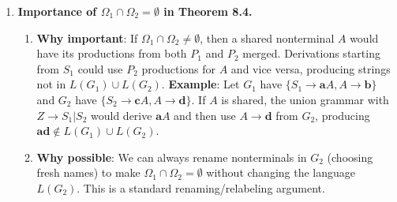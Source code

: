 \begin{enumerate}[{8.}1. ]
$C = \langle\{S,A,B\},\{\pmb{0},\pmb{1}\},S,\{S\to\pmb{0}A|\pmb{1}B|\pmb{0}|\pmb{1}|\lambda,A\to S\pmb{0},B\to S\pmb{1}\}\rangle$.

\begin{enumerate}
\item $L(C) = \{w \in \{\pmb{0},\pmb{1}\}^* \mid w = w^r\}$ --- the set of all palindromes over $\{\pmb{0},\pmb{1}\}$.

Derivation: $S \Rightarrow \pmb{0}A \Rightarrow \pmb{0}S\pmb{0}$. Each step wraps the current sentential form between matching symbols. The grammar generates all even-length and odd-length palindromes.

\item Yes, $L(C) = \{w \mid w = w^r\}$ is not regular (it requires unbounded memory to match the first and last symbols). So $L(C)$ is FAD only for the trivial case; in general, $L(C)$ is not FAD.

\item The definition of regular grammars should \emph{not} be expanded to include such mixed grammars, because the resulting class of languages would no longer coincide with the regular languages. Mixed grammars generate languages (like palindromes) that are context-free but not regular.
\end{enumerate}

\item \textbf{Importance of $\Omega_1 \cap \Omega_2 = \emptyset$ in Theorem 8.4.}

\begin{enumerate}
\item \textbf{Why important}: If $\Omega_1 \cap \Omega_2 \neq \emptyset$, then a shared nonterminal $A$ would have its productions from both $P_1$ and $P_2$ merged. Derivations starting from $S_1$ could use $P_2$ productions for $A$ and vice versa, producing strings not in $L(G_1) \cup L(G_2)$.
\textbf{Example}: Let $G_1$ have $\{S_1 \to \pmb{a}A, A \to \pmb{b}\}$ and $G_2$ have $\{S_2 \to \pmb{c}A, A \to \pmb{d}\}$. If $A$ is shared, the union grammar with $Z \to S_1 | S_2$ would derive $\pmb{a}A$ and then use $A \to \pmb{d}$ from $G_2$, producing $\pmb{ad} \notin L(G_1) \cup L(G_2)$.

\item \textbf{Why possible}: We can always rename nonterminals in $G_2$ (choosing fresh names) to make $\Omega_1 \cap \Omega_2 = \emptyset$ without changing the language $L(G_2)$. This is a standard renaming/relabeling argument.
\end{enumerate}


\end{enumerate}
